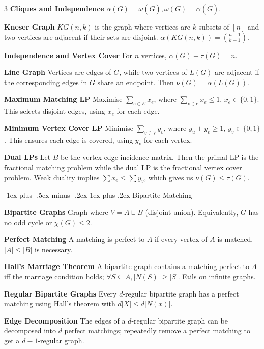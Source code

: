 \documentclass[10pt, landscape]{article}
\makeatletter
\renewcommand{\subsection}{\@startsection{subsection}{3}{0mm}%
                                {-1ex plus -.5ex minus -.2ex}%
                                {1ex plus .2ex}%
                                {\normalfont\small\bfseries}}%
\makeatother
\begin{document}
\begin{multicols*}{3}
\textbf{Cliques and Independence} $\alpha(G)=\omega(\overline{G}), \omega(G)=\alpha(\overline{G})$.

\textbf{Kneser Graph} $KG(n, k)$ is the graph where vertices are $k$-subsets of $[n]$ and two vertices are adjacent if their sets are disjoint. $\alpha(KG(n,k))={n-1 \choose k-1}$.

\textbf{Independence and Vertex Cover} For $n$ vertices, $\alpha(G)+\tau(G)=n$.

\textbf{Line Graph} Vertices are edges of $G$, while two vertices of $L(G)$ are adjacent if the corresponding edges in $G$ share an endpoint. Then $\nu(G)=\alpha(L(G))$.

\textbf{Maximum Matching LP} Maximise $\sum_{e \in E} x_e$, where $\sum_{v \in e}x_e \leq 1$, $x_e \in \{0,1\}$. This selects disjoint edges, using $x_e$ for each edge.

\textbf{Minimum Vertex Cover LP} Minimise $\sum_{v \in V}y_v$, where $y_u+y_v \geq 1$, $y_v \in \{0, 1\}$. This ensures each edge is covered, using $y_v$ for each vertex.

\textbf{Dual LPs} Let $B$ be the vertex-edge incidence matrix. Then the primal LP is the fractional matching problem while the dual LP is the fractional vertex cover problem. Weak duality implies $\sum x_e \leq \sum y_v$, which gives us $\nu(G) \leq \tau(G)$.

\subsection{Bipartite Matching}

\textbf{Bipartite Graphs} Graph where $V=A \sqcup B$ (disjoint union). Equivalently, $G$ has no odd cycle or $\chi(G) \leq 2$.

\textbf{Perfect Matching} A matching is perfect to $A$ if every vertex of $A$ is matched. $|A| \leq |B|$ is necessary.

\textbf{Hall's Marriage Theorem} A bipartite graph contains a matching perfect to $A$ iff the marriage condition holds; $\forall S \subseteq A, |N(S)| \geq |S|$. Fails on infinite graphs.

\textbf{Regular Bipartite Graphs} Every $d$-regular bipartite graph has a perfect matching using Hall's theorem with $d|X| \leq d|N(x)|$.

\textbf{Edge Decomposition} The edges of a $d$-regular bipartite graph can be decomposed into $d$ perfect matchings; repeatedly remove a perfect matching to get a $d-1$-regular graph.


\end{multicols*}
\end{document}
